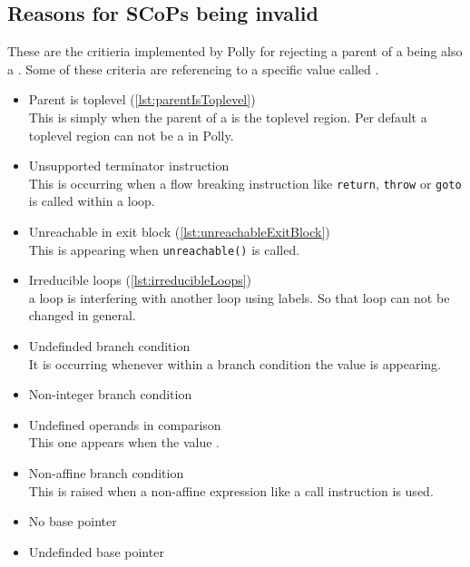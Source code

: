 \subsection{Reasons for SCoPs being invalid}
These are the critieria implemented by Polly for rejecting a parent of a \scop being also a \scop.
Some of these criteria are referencing to a \LLVM specific value called \undefv.\cite{llvmUndef}
\begin{itemize}
    \item Parent is toplevel (\autoref{lst:parentIsToplevel})\\
        This is simply when the parent of a \scop is the toplevel region.
        Per default a toplevel region can not be a \scop in Polly.
    \item Unsupported terminator instruction\\
        This is occurring when a flow breaking instruction like \texttt{return}, \texttt{throw} or \texttt{goto} is called within a loop.
    \item Unreachable in exit block (\autoref{lst:unreachableExitBlock})\\
        This is appearing when \texttt{unreachable()} is called.\cite{llvmUnreachable}
    \item Irreducible loops (\autoref{lst:irreducibleLoops})\\
        \Eg a loop is interfering with another loop using labels.
        So that loop can not be changed in general.
    \item Undefinded branch condition\\
        It is occurring whenever within a branch condition the value \undefv is appearing.
    \item Non-integer branch condition\\
    \item Undefined operands in comparison\\
        This one appears when the value \undefv.
    \item Non-affine branch condition\\
        This is raised when a non-affine expression like a call instruction is used.
    \item No base pointer\\
    \item Undefinded base pointer\\

\end{itemize}
